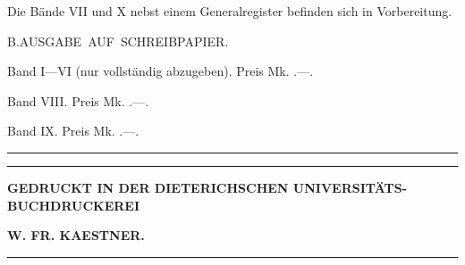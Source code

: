 \par\medskip\noindent Die Bände VII und X nebst einem Generalregister befinden sich in Vorbereitung.
\begin{center}
{\fontsize{13}{16}\selectfont\mbox{\llap{\raisebox{.4ex}{\fontsize{5}{6}\selectfont,}\hspace{2.5em}}B.\quad AUSGABE AUF SCHREIBPAPIER.}}
\end{center}
\noindent Band I---VI (nur vollständig abzugeben). Preis Mk. {\fontsize{8}{10}.---.}\par
\noindent Band VIII. Preis Mk. {\fontsize{8}{10}.---.}\par
\noindent Band IX. Preis Mk. {\fontsize{8}{10}.---.}\par
\begin{center}\rule{3cm}{.3pt}\end{center}
\par\noindent{}
\vfill
\begin{center}
\rule{8cm}{.3pt}\par\bigskip
{\fontsize{14}{18}\selectfont{}}\par\bigskip
{\fontsize{8}{11}\selectfont\textbf{GEDRUCKT IN DER DIETERICHSCHEN UNIVERSITÄTS-BUCHDRUCKEREI}}\par\medskip
{\fontsize{8}{11}\selectfont\textbf{W. FR. KAESTNER.}}\par\bigskip
\rule{8cm}{.3pt}
\end{center}
\endgroup
